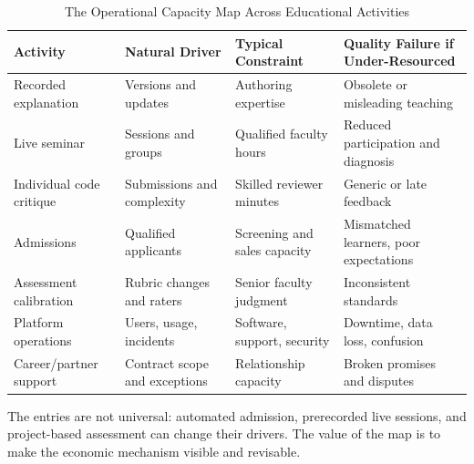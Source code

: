 \begin{table}[t]
\centering
\small
\caption{The Operational Capacity Map Across Educational Activities}
\begin{tabularx}{\textwidth}{p{}p{}p{}X}
\toprule
\textbf{Activity} & \textbf{Natural Driver} & \textbf{Typical Constraint} & \textbf{Quality Failure if Under-Resourced} \\
\midrule
Recorded explanation & Versions and updates & Authoring expertise & Obsolete or misleading teaching \\
Live seminar & Sessions and groups & Qualified faculty hours & Reduced participation and diagnosis \\
Individual code critique & Submissions and complexity & Skilled reviewer minutes & Generic or late feedback \\
Admissions & Qualified applicants & Screening and sales capacity & Mismatched learners, poor expectations \\
Assessment calibration & Rubric changes and raters & Senior faculty judgment & Inconsistent standards \\
Platform operations & Users, usage, incidents & Software, support, security & Downtime, data loss, confusion \\
Career/partner support & Contract scope and exceptions & Relationship capacity & Broken promises and disputes \\
\bottomrule
\end{tabularx}
\end{table}

The entries are not universal: automated admission, prerecorded live sessions, and project-based assessment can change their drivers. The value of the map is to make the economic mechanism visible and revisable.

